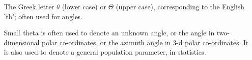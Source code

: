 The Greek letter $ \theta $ (lower case) or $ \Theta $ (upper case),
corresponding to the English 'th'; often used for angles.
\par
Small theta is often used to denote an unknown angle, or the
angle in two-dimensional polar co-ordinates,
or the azimuth angle in 3-d polar co-ordinates.
It is also used to denote a general population parameter, in
statistics.
